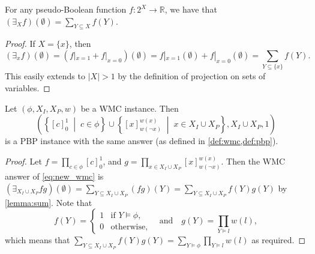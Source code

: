 \begin{lemma} \label{lemma:sum}
  For any pseudo-Boolean function $f\colon 2^X \to \mathbb{R}$, we have that
  $(\exists_X f)(\emptyset) = \sum_{Y \subseteq X} f(Y)$.
\end{lemma}
\begin{proof}
  If $X = \{x\}$, then
  \[
  (\exists_xf)(\emptyset) = (f|_{x=1} + f|_{x=0})(\emptyset) = f|_{x=1}(\emptyset) + f|_{x=0}(\emptyset) = \sum_{Y \subseteq \{x\}} f(Y).
  \]
  This easily extends to $|X| > 1$ by the definition of projection on sets of variables.
\end{proof}

\begin{proposition} \label{prop:equivalence}
  Let $(\phi, X_I, X_P, w)$ be a WMC instance. Then
  \begin{equation}
  \left(\left\{[c]_0^1 \;\middle|\; c \in \phi\right\} \cup \left\{[x]_{w(\neg
        x)}^{w(x)} \;\middle|\; x \in X_I \cup X_P\right\}, X_I \cup X_P,
    1\right) \label{eq:new_wmc}
  \end{equation}
  is a PBP instance with the same answer (as defined in \cref{def:wmc,def:pbp}).
\end{proposition}

\begin{proof}
  Let $f = \prod_{c \in \phi} [c]_0^1$, and $g = \prod_{x \in X_I \cup X_P}
  [x]_{w(\neg x)}^{w(x)}$. Then the WMC answer of \eqref{eq:new_wmc} is
  $(\exists_{X_I \cup X_P} fg)(\emptyset) = \sum_{Y \subseteq X_I \cup X_P}
  (fg)(Y) = \sum_{Y \subseteq X_I \cup X_P} f(Y)g(Y)$ by \cref{lemma:sum}. Note
  that
  \[
    f(Y) =
    \begin{cases}
      1 & \text{if } Y \models \phi, \\
      0 & \text{otherwise},
    \end{cases}
    \quad
    \text{and}
    \quad
    g(Y) = \prod_{Y \models l} w(l),
  \]
  which means that $\sum_{Y \subseteq X_I \cup X_P} f(Y)g(Y) = \sum_{Y \models
    \phi} \prod_{Y \models l} w(l)$ as required.
\end{proof}

